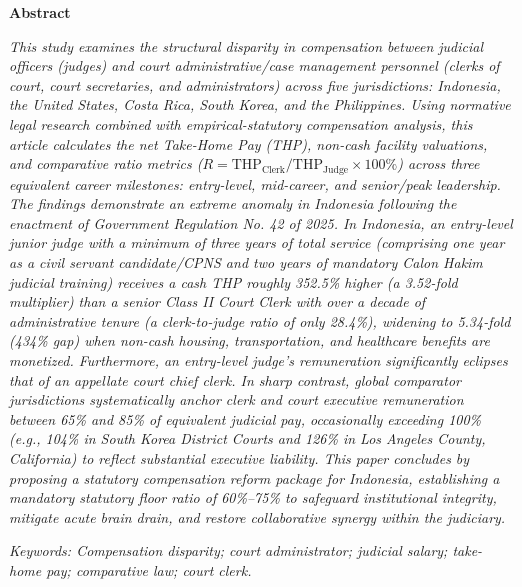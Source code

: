 \documentclass[12pt, a4paper]{article}
\begin{document}
\begin{minipage}[t]{0.73\textwidth}
    \vspace{0pt}
    \centering\textbf{Abstract}\par
    \vspace{0.5em}
    \small
    \textit{This study examines the structural disparity in compensation between judicial officers (judges) and court administrative/case management personnel (clerks of court, court secretaries, and administrators) across five jurisdictions: Indonesia, the United States, Costa Rica, South Korea, and the Philippines. Using normative legal research combined with empirical-statutory compensation analysis, this article calculates the net Take-Home Pay (THP), non-cash facility valuations, and comparative ratio metrics ($R = \text{THP}_{\text{Clerk}} / \text{THP}_{\text{Judge}} \times 100\%$) across three equivalent career milestones: entry-level, mid-career, and senior/peak leadership. The findings demonstrate an extreme anomaly in Indonesia following the enactment of Government Regulation No. 42 of 2025. In Indonesia, an entry-level junior judge with a minimum of three years of total service (comprising one year as a civil servant candidate/CPNS and two years of mandatory \textit{Calon Hakim} judicial training) receives a cash THP roughly 352.5\% higher (a 3.52-fold multiplier) than a senior Class II Court Clerk with over a decade of administrative tenure (a clerk-to-judge ratio of only 28.4\%), widening to 5.34-fold (434\% gap) when non-cash housing, transportation, and healthcare benefits are monetized. Furthermore, an entry-level judge's remuneration significantly eclipses that of an appellate court chief clerk. In sharp contrast, global comparator jurisdictions systematically anchor clerk and court executive remuneration between 65\% and 85\% of equivalent judicial pay, occasionally exceeding 100\% (e.g., 104\% in South Korea District Courts and 126\% in Los Angeles County, California) to reflect substantial executive liability. This paper concludes by proposing a statutory compensation reform package for Indonesia, establishing a mandatory statutory floor ratio of 60\%--75\% to safeguard institutional integrity, mitigate acute brain drain, and restore collaborative synergy within the judiciary.}\par
    \vspace{1em}
    \textit{Keywords: Compensation disparity; court administrator; judicial salary; take-home pay; comparative law; court clerk.}
\end{minipage}
\end{document}

